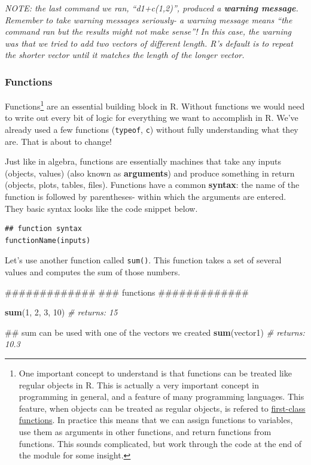 \documentclass[]{article}
\newenvironment{Shaded}{\begin{snugshade}}{\end{snugshade}}
\newcommand{\KeywordTok}[1]{\textcolor[rgb]{0.13,0.29,0.53}{\textbf{#1}}}
\newcommand{\DecValTok}[1]{\textcolor[rgb]{0.00,0.00,0.81}{#1}}
\newcommand{\CommentTok}[1]{\textcolor[rgb]{0.56,0.35,0.01}{\textit{#1}}}
\newcommand{\NormalTok}[1]{#1}
\let\rmarkdownfootnote\footnote%
\def\footnote{\protect\rmarkdownfootnote}
\begin{document}
\emph{NOTE: the last command we ran, ``d1+c(1,2)'', produced a
\textbf{warning message}. Remember to take warning messages seriously- a
warning message means ``the command ran but the results might not make
sense''! In this case, the warning was that we tried to add two vectors
of different length. R's default is to repeat the shorter vector until
it matches the length of the longer vector.}

\subsubsection{Functions}\label{functions}

Functions\footnote{One important concept to understand is that functions
  can be treated like regular objects in R. This is actually a very
  important concept in programming in general, and a feature of many
  programming languages. This feature, when objects can be treated as
  regular objects, is refered to
  \href{https://en.wikipedia.org/wiki/First-class_function}{first-class
  functions}. In practice this means that we can assign functions to
  variables, use them as arguments in other functions, and return
  functions from functions. This sounds complicated, but work through
  the code at the end of the module for some insight.} are an essential
building block in R. Without functions we would need to write out every
bit of logic for everything we want to accomplish in R. We've already
used a few functions (\texttt{typeof}, \texttt{c}) without fully
understanding what they are. That is about to change!

Just like in algebra, functions are essentially machines that take any
inputs (objects, values) (also known as \textbf{arguments}) and produce
something in return (objects, plots, tables, files). Functions have a
common \textbf{syntax}: the name of the function is followed by
parentheses- within which the arguments are entered. They basic syntax
looks like the code snippet below.

\begin{verbatim}
## function syntax
functionName(inputs)
\end{verbatim}

Let's use another function called \texttt{sum()}. This function takes a
set of several values and computes the sum of those numbers.

\begin{Shaded}
\begin{Highlighting}[]
\NormalTok{#############}
\NormalTok{### functions}
\NormalTok{#############}

\KeywordTok{sum}\NormalTok{(}\DecValTok{1}\NormalTok{, }\DecValTok{2}\NormalTok{, }\DecValTok{3}\NormalTok{, }\DecValTok{10}\NormalTok{)    }\CommentTok{# returns: 15}

\NormalTok{## sum can be used with one of the vectors we created}
\KeywordTok{sum}\NormalTok{(vector1)        }\CommentTok{# returns: 10.3}
\end{Highlighting}
\end{Shaded}
\end{document}

